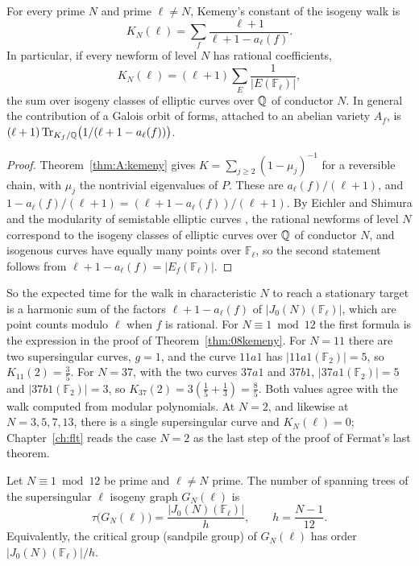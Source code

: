 \begin{theorem}\label{thm:hitkemeny}
For every prime $N$ and prime $\ell\ne N$, Kemeny's constant of the isogeny walk is
\[
K_N(\ell)=\sum_f\frac{\ell+1}{\ell+1-a_\ell(f)} .
\]
In particular, if every newform of level $N$ has rational coefficients,
\[
K_N(\ell)=(\ell+1)\sum_{E}\frac1{|E(\mathbb F_\ell)|},
\]
the sum over isogeny classes of elliptic curves over $\mathbb{Q}$ of conductor $N$. In general the contribution of a Galois orbit of forms, attached to an abelian variety $A_f$, is $(\ell+1)\operatorname{Tr}_{K_f/\mathbb{Q}}\bigl(1/(\ell+1-a_\ell(f))\bigr)$.
\end{theorem}

\begin{proof}
Theorem~\ref{thm:A:kemeny} gives $K=\sum_{j\ge2}(1-\mu_j)^{-1}$ for a reversible chain, with $\mu_j$ the nontrivial eigenvalues of $P$. These are $a_\ell(f)/(\ell+1)$, and $1-a_\ell(f)/(\ell+1)=(\ell+1-a_\ell(f))/(\ell+1)$. By Eichler and Shimura and the modularity of semistable elliptic curves \cite{wiles1995,taylorwiles1995}, the rational newforms of level $N$ correspond to the isogeny classes of elliptic curves over $\mathbb{Q}$ of conductor $N$, and isogenous curves have equally many points over $\mathbb F_\ell$, so the second statement follows from $\ell+1-a_\ell(f)=|E_f(\mathbb F_\ell)|$.
\end{proof}

So the expected time for the walk in characteristic $N$ to reach a stationary target is a harmonic sum of the factors $\ell+1-a_\ell(f)$ of $|J_0(N)(\mathbb F_\ell)|$, which are point counts modulo $\ell$ when $f$ is rational. For $N\equiv1\bmod12$ the first formula is the expression in the proof of Theorem~\ref{thm:08kemeny}. For $N=11$ there are two supersingular curves, $g=1$, and the curve $11a1$ has $|11a1(\mathbb F_2)|=5$, so $K_{11}(2)=\frac35$. For $N=37$, with the two curves $37a1$ and $37b1$, $|37a1(\mathbb F_2)|=5$ and $|37b1(\mathbb F_2)|=3$, so $K_{37}(2)=3(\frac15+\frac13)=\frac85$. Both values agree with the walk computed from modular polynomials. At $N=2$, and likewise at $N=3,5,7,13$, there is a single supersingular curve and $K_N(\ell)=0$; Chapter~\ref{ch:flt} reads the case $N=2$ as the last step of the proof of Fermat's last theorem.

\begin{theorem}\label{thm:hittrees}
Let $N\equiv1\bmod12$ be prime and $\ell\ne N$ prime. The number of spanning trees of the supersingular $\ell$ isogeny graph $G_N(\ell)$ is
\[
\tau\bigl(G_N(\ell)\bigr)=\frac{|J_0(N)(\mathbb F_\ell)|}{h},\qquad h=\frac{N-1}{12}.
\]
Equivalently, the critical group (sandpile group) of $G_N(\ell)$ has order $|J_0(N)(\mathbb F_\ell)|/h$.
\end{theorem}

